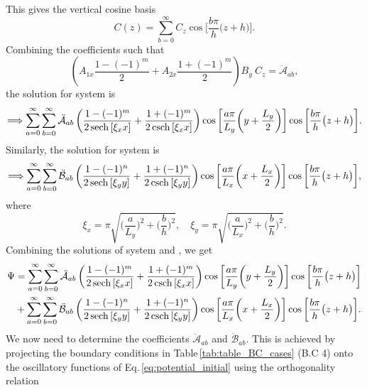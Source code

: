 \documentclass[aps,prfluids,reprint,superscriptaddress]{revtex4-2}
\newcommand{\nn}{\nonumber}
\newcommand{\RN}[1]{%
	\textup{\uppercase\expandafter{\romannumeral#1}}%
}
\numberwithin{equation}{section}
\begin{document}
This gives the vertical cosine basis
\begin{equation}
	C(z) = \sum_{b=0}^{\infty}
	 C_{z} \cos{\biggl[ \frac{b\pi}{h}\bigl(z + h\bigr)\biggr]}.
\end{equation}
Combining the coefficients such that
\begin{equation}
	\left(A_{1x} \frac{1-(-1)^m}{2} + A_{2x} \frac{1+(-1)^m}{2}\right)
	B_y\: C_z = \ddot{\mathcal{A}}_{ab},
\end{equation}
the solution for system \RN{1} is
\begin{equation}
	\Longrightarrow
	\sum_{a=0}^{\infty} \sum_{b=0}^{\infty}
	\ddot{\mathcal{A}}_{ab} 
	\left(\frac{1-(-1)^m}{2\sech{[\xi_x x]}} + \frac{1+(-1)^m}{2\csch{[\xi_x x]}}
	\right)
	\cos{\biggl[ \frac{a\pi}{L_y}\biggl(y + \frac{L_y}{2}\biggr)\biggr]}
	\cos{\biggl[ \frac{b\pi}{h}\bigl(z+h\bigr)\biggr]} .
	\label{eq:sol_system1}
\end{equation}
Similarly, the solution for system \RN{2} is
\begin{equation}
	\Longrightarrow
	\sum_{a=0}^{\infty} \sum_{b=0}^{\infty}
	\ddot{\mathcal{B}}_{ab}
	\left(\frac{1-(-1)^n}{2\sech{[\xi_y y]}} + \frac{1+(-1)^n}{2\csch{[\xi_y y]}}
	\right)
	\cos{\biggl[ \frac{a\pi}{L_x}\biggl(x + \frac{L_x}{2}\biggr)\biggr]}
	\cos{\biggl[ \frac{b\pi}{h}\bigl(z+h\bigr)\biggr]} ,
\end{equation}
where
\begin{equation}
	\xi_x = \pi\sqrt{
	\biggl(\frac{a}{L_y}\biggr)^2 + \biggl(\frac{b}{h}\biggr)^2
	}, \quad
	\xi_y = \pi\sqrt{
		\biggl(\frac{a}{L_x}\biggr)^2 + \biggl(\frac{b}{h}\biggr)^2
	}.
\end{equation}
Combining the solutions of system \RN{1} and \RN{2}, we get
\begin{align}
	\nn
	\Psi &= 
	\sum_{a=0}^{\infty} \sum_{b=0}^{\infty}
	\ddot{\mathcal{A}}_{ab} 
	\left(\frac{1-(-1)^m}{2\sech{[\xi_x x]}} + \frac{1+(-1)^m}{2\csch{[\xi_x x]}}
	\right)
	\cos{\biggl[ \frac{a\pi}{L_y}\biggl(y + \frac{L_y}{2}\biggr)\biggr]}
	\cos{\biggl[ \frac{b\pi}{h}\bigl(z+h\bigr)\biggr]}
	 \\
	 &+ 
	 \sum_{a=0}^{\infty} \sum_{b=0}^{\infty}
	 \ddot{\mathcal{B}}_{ab} 
	 \left(\frac{1-(-1)^n}{2\sech{[\xi_y y]}} + \frac{1+(-1)^n}{2\csch{[\xi_y y]}}
	 \right)
	 \cos{\biggl[ \frac{a\pi}{L_x}\biggl(x + \frac{L_x}{2}\biggr)\biggr]}
	 \cos{\biggl[ \frac{b\pi}{h}\bigl(z+h\bigr)\biggr]} .
	 \label{eq:potential_initial}
\end{align}
We now need to determine the coefficients $\ddot{\mathcal{A}}_{ab}$ and $\ddot{\mathcal{B}}_{ab}$. This is achieved by projecting the boundary conditions in Table\,\ref{tab:table_BC_cases} (B.C 4) onto the oscillatory functions of Eq.\,\eqref{eq:potential_initial} using the orthogonality relation
\end{document}
